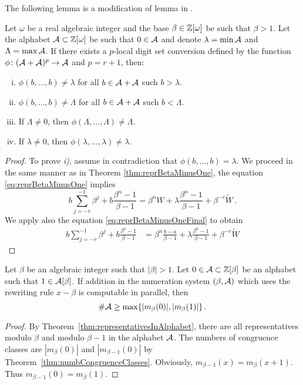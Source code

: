 The following lemma is a modification of lemma in \cite{minAlph}.
\begin{lem}
Let $\omega$ be a real algebraic integer and the base $\beta\in\mathbb{Z}[\omega]$ be such that $\beta>1$. Let the alphabet $\mathcal{A}\subset\mathbb{Z}[\omega]$ be such that $0\in\mathcal{A}$ and denote $\lambda=\min \mathcal{A}$ and $\Lambda=\max \mathcal{A}$. If there exists a $p$-local digit set conversion defined by the function $\phi\colon (\mathcal{A}+\mathcal{A})^p\rightarrow \mathcal{A}$ and $p=r+1$, then:
\begin{enumerate}[i)]
	\item $\phi(b,\dots,b)\neq \lambda$ for all $b\in\mathcal{A}+\mathcal{A}$ such $b>\lambda$.
	\item $\phi(b,\dots,b)\neq \Lambda$ for all $b\in\mathcal{A}+\mathcal{A}$ such $b<\Lambda$.
	\item If $\Lambda\neq 0$, then $\phi(\Lambda,\dots,\Lambda)\neq \Lambda$.
	\item If $\lambda\neq 0$, then $\phi(\lambda,\dots,\lambda)\neq \lambda$.
\end{enumerate}
\end{lem}
\begin{proof}
To prove \textit{i)}, assume in contradiction that $\phi(b,\dots,b)= \lambda$. We proceed in the same manner as in Theorem \ref{thm:reprBetaMinusOne}, the equation \eqref{eq:reprBetaMinusOne} implies
$$
b \sum_{j=-r}^{-1} \beta^j +b\frac{\beta^n-1}{\beta-1} =  \beta^n W + \lambda \frac{\beta^n-1}{\beta-1} + \beta^{-r}\widetilde{W}\,.
$$
We apply also the equation \eqref{eq:reprBetaMinusOneFinal} to obtain
\begin{align*}
b \sum_{j=-r}^{-1} \beta^j +b\frac{\beta^n-1}{\beta-1} &=  \beta^n \frac{b-a}{\beta-1} + \lambda \frac{\beta^n-1}{\beta-1} + \beta^{-r}\widetilde{W}
\end{align*}
\end{proof}










\begin{thm}
Let $\beta$ be an algebraic integer such that $|\beta|>1$. Let $0\in \mathcal{A}\subset \mathbb{Z}[\beta]$ be an alphabet such that $1\in \mathcal{A}[\beta]$. If addition in the numeration system $(\beta, \mathcal{A})$ which uses the rewriting rule $x-\beta$ is computable in parallel, then
$$
\#\mathcal{A} \geq \max \{|m_\beta(0)|, |m_\beta(1)|\}\,.
$$
\end{thm}
\begin{proof}
By Theorem~\ref{thm:representativesInAlphabet}, there are all representatives modulo $\beta$ and modulo $\beta-1$ in the alphabet $\mathcal{A}$. The numbers of congruence classes are $|m_\beta(0)|$ and $|m_{\beta-1}(0)|$ by Theorem~\ref{thm:numbCongruenceClasses}. Obviously, $m_{\beta-1}(x) = m_\beta (x+1)$. Thus $m_{\beta-1}(0) = m_\beta (1)$.
\end{proof}


